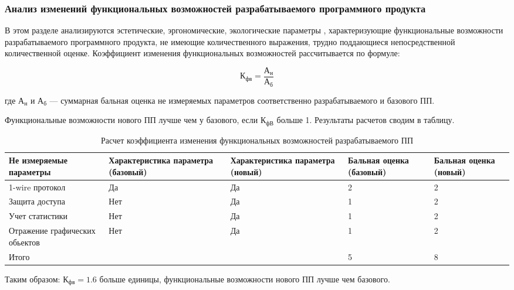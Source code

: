 \subsubsection{Анализ изменений функциональных возможностей разрабатываемого программного продукта}
\begin{par}
В этом разделе анализируются  эстетические, эргономические,
экологические параметры , характеризующие функциональные возможности 
разрабатываемого программного продукта, не имеющие количественного 
выражения, трудно поддающиеся непосредственной количественной оценке.
Коэффициент изменения функциональных возможностей рассчитывается
по  формуле:
\end{par}


\begin{equation}
	К_{фв} = \frac{А_{н}}{А_{б}}
\end{equation}
\begin{ESKDexplanation}
	\item[где ]{} $А_{н}$ и $А_{б}$ --- суммарная бальная оценка не измеряемых параметров соответственно разрабатываемого и базового ПП.
\end{ESKDexplanation}
Функциональные возможности нового ПП лучше чем у базового, если $К_{фВ}$  больше 1.
Результаты расчетов сводим в таблицу.

\begin{table}[H]
\caption{Расчет коэффициента изменения функциональных возможностей разрабатываемого ПП}
\begin{tabular}{|p{3cm}|p{3cm}|p{3cm}|p{3cm}|p{3cm}|}
\hline{}
Не измеряемые параметры & Характе\-ристика параметра (базовый) & Характе\-ристика параметра (новый) & Бальная оценка (базовый) & Бальная оценка (новый) \\
\hline{}
1-wire протокол & Да & Да & 2 & 2 \\
\hline{}
Защита доступа & Нет & Да & 1 & 2 \\
\hline{}
Учет статистики & Нет & Да & 1 & 2 \\
\hline{}
Отражение графических обьектов & Нет & Да & 1 & 2 \\
\hline{}
Итого & & & 5 & 8 \\
\hline
\end{tabular}
\label{table:calcKoefTechProgress}
\end{table}

Таким образом: $К_{фв} = 1.6$  больше единицы, функциональные возможности нового ПП лучше чем базового.



